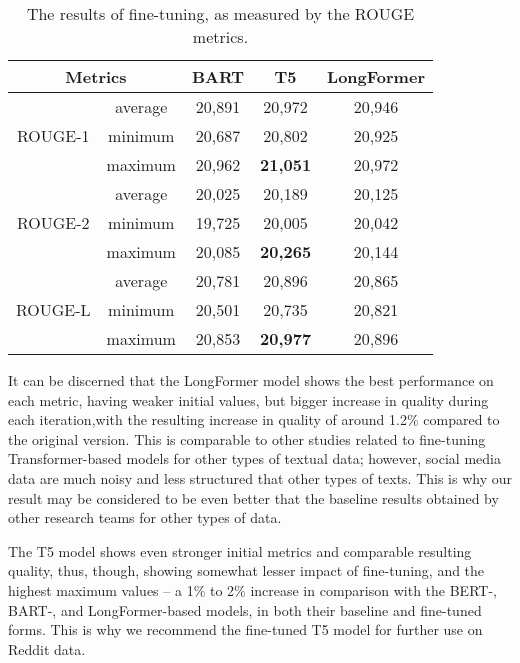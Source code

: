 \begin{table}[ht]%
	\centering
	\caption{The results of fine-tuning, as measured by the ROUGE metrics.}%
	\label{tab:rougeMetricsFineTuning}%
		\begin{tabular}{ c  c  c  c  c }%
			\toprule
			\multicolumn{2}{c}{Metrics} & BART & T5 & LongFormer \\
			\hline
			& average & 20,891 & 20,972 & 20,946\\
			ROUGE-1 & minimum & 20,687 & 20,802 & 20,925\\
			& maximum & 20,962 & \textbf{21,051} & 20,972\\
			& average & 20,025 & 20,189 & 20,125 \\
			ROUGE-2 & minimum & 19,725 & 20,005 & 20,042\\
			& maximum & 20,085 & \textbf{20,265} & 20,144\\
			& average & 20,781 & 20,896 & 20,865\\
			ROUGE-L & minimum & 20,501 & 20,735 & 20,821\\
			& maximum & 20,853 & \textbf{20,977} & 20,896\\
		\end{tabular}%
\end{table}

It can be discerned that the LongFormer model shows the best performance on each metric, having weaker initial values, but bigger increase in quality during each iteration,with the resulting increase in quality of around 1.2\% compared to the original version. This is comparable to other studies related to fine-tuning Transformer-based models for other types of textual data; however, social media data are much noisy and less structured that other types of texts. This is why our result may be considered to be even better that the baseline results obtained by other research teams for other types of data.

The T5 model shows even stronger initial metrics and comparable resulting quality, thus, though, showing somewhat lesser impact of fine-tuning, and the highest maximum values -- a 1\% to 2\% increase in comparison with the BERT-, BART-, and LongFormer-based models, in both their baseline and fine-tuned forms. This is why we recommend the fine-tuned T5 model for further use on Reddit data.

